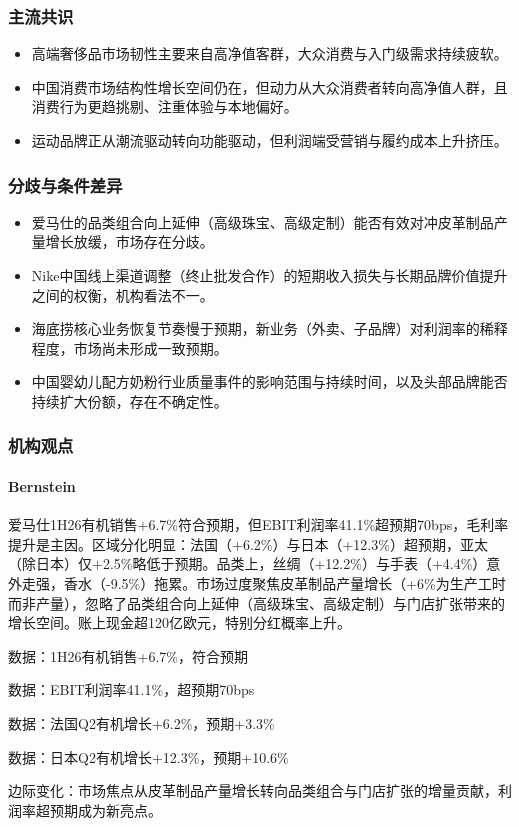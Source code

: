 \documentclass[11pt]{ctexart}
\begin{document}
\subsubsection*{主流共识}
\begin{itemize}
  \item 高端奢侈品市场韧性主要来自高净值客群，大众消费与入门级需求持续疲软。
  \item 中国消费市场结构性增长空间仍在，但动力从大众消费者转向高净值人群，且消费行为更趋挑剔、注重体验与本地偏好。
  \item 运动品牌正从潮流驱动转向功能驱动，但利润端受营销与履约成本上升挤压。
\end{itemize}
\subsubsection*{分歧与条件差异}
\begin{itemize}
  \item 爱马仕的品类组合向上延伸（高级珠宝、高级定制）能否有效对冲皮革制品产量增长放缓，市场存在分歧。
  \item Nike中国线上渠道调整（终止批发合作）的短期收入损失与长期品牌价值提升之间的权衡，机构看法不一。
  \item 海底捞核心业务恢复节奏慢于预期，新业务（外卖、子品牌）对利润率的稀释程度，市场尚未形成一致预期。
  \item 中国婴幼儿配方奶粉行业质量事件的影响范围与持续时间，以及头部品牌能否持续扩大份额，存在不确定性。
\end{itemize}
\subsubsection*{机构观点}
\paragraph{Bernstein} 爱马仕1H26有机销售+6.7\%符合预期，但EBIT利润率41.1\%超预期70bps，毛利率提升是主因。区域分化明显：法国（+6.2\%）与日本（+12.3\%）超预期，亚太（除日本）仅+2.5\%略低于预期。品类上，丝绸（+12.2\%）与手表（+4.4\%）意外走强，香水（-9.5\%）拖累。市场过度聚焦皮革制品产量增长（+6\%为生产工时而非产量），忽略了品类组合向上延伸（高级珠宝、高级定制）与门店扩张带来的增长空间。账上现金超120亿欧元，特别分红概率上升。
{\small\color{refgray}数据：1H26有机销售+6.7\%，符合预期\par}
{\small\color{refgray}数据：EBIT利润率41.1\%，超预期70bps\par}
{\small\color{refgray}数据：法国Q2有机增长+6.2\%，预期+3.3\%\par}
{\small\color{refgray}数据：日本Q2有机增长+12.3\%，预期+10.6\%\par}
{\small\color{refgray}边际变化：市场焦点从皮革制品产量增长转向品类组合与门店扩张的增量贡献，利润率超预期成为新亮点。\par}
\end{document}
